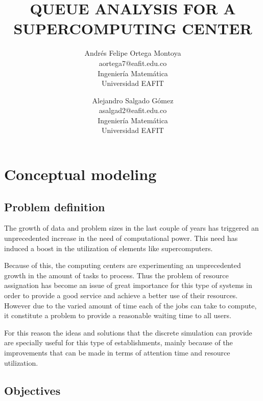 \documentclass{wscpaperproc}
\begin{document}

\title{QUEUE ANALYSIS FOR A SUPERCOMPUTING CENTER}

\author{Andrés Felipe Ortega Montoya\\ [12pt]
aortega7@eafit.edu.co\\
Ingeniería Matemática\\
Universidad EAFIT\\
\and
Alejandro Salgado Gómez\\[12pt]
asalgad2@eafit.edu.co\\
Ingeniería Matemática\\
Universidad EAFIT\\
}

\maketitle

\section{Conceptual modeling}

\subsection{Problem definition}

The growth of data and problem sizes in the last couple of years has
triggered an unprecedented increase in the need of computational
power. This need has induced a boost in the utilization of
elements like supercomputers.

Because of this, the computing centers are experimenting an unprecedented growth
in the amount of tasks to process. Thus the problem of resource assignation has
become an issue of great importance for this type of systems in order to
provide a good service and achieve a better use of their resources. However due
to the varied amount of time each of the jobs can take to compute, it
constitute a problem to provide a reasonable waiting time to all users.

For this reason the ideas and solutions that the discrete simulation can provide
are specially useful for this type of establishments, mainly because of
the improvements that can be made in terms of attention time and resource
utilization.

\subsection{Objectives}
\end{document}
